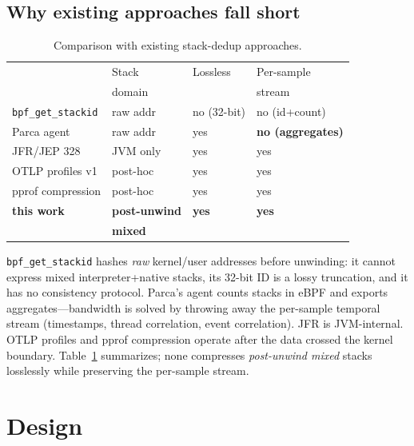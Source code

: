 \documentclass[letterpaper,twocolumn,10pt]{article}
\begin{document}
\subsection{Why existing approaches fall short}
\begin{table}[t]
\centering
\small
\begin{tabular}{@{}llll@{}}
\toprule
 & Stack & Lossless & Per-sample \\
 & domain & & stream \\
\midrule
\texttt{bpf\_get\_stackid} & raw addr & no (32-bit) & no (id+count) \\
Parca agent & raw addr & yes & \textbf{no (aggregates)} \\
JFR/JEP 328 \cite{jfr} & JVM only & yes & yes \\
OTLP profiles v1 & post-hoc & yes & yes \\
pprof compression & post-hoc & yes & yes \\
\textbf{this work} & \textbf{post-unwind} & \textbf{yes} & \textbf{yes} \\
 & \textbf{mixed} & & \\
\bottomrule
\end{tabular}
\caption{Comparison with existing stack-dedup approaches.}
\label{tab:related}
\end{table}
\texttt{bpf\_get\_stackid} hashes \emph{raw} kernel/user addresses before
unwinding: it cannot express mixed interpreter+native stacks, its 32-bit ID
is a lossy truncation, and it has no consistency protocol. Parca's agent
counts stacks in eBPF and exports aggregates---bandwidth is solved by
throwing away the per-sample temporal stream (timestamps, thread
correlation, event correlation). JFR is JVM-internal. OTLP profiles and
pprof compression operate after the data crossed the kernel boundary.
Table~\ref{tab:related} summarizes; none compresses \emph{post-unwind
mixed} stacks losslessly while preserving the per-sample stream.

\section{Design}
\label{sec:design}
\end{document}
